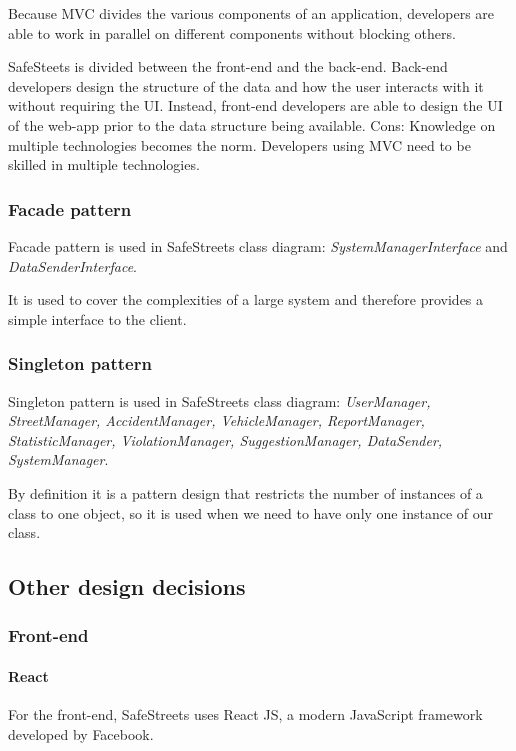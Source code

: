 Because MVC divides the various components of an application, developers are able to work in parallel on different components without blocking others. 

SafeSteets is divided between the front-end and the back-end. Back-end developers design the structure of the data and how the user interacts with it without requiring the UI. Instead, front-end developers are able to design the UI of the web-app prior to the data structure being available.
Cons: Knowledge on multiple technologies becomes the norm. Developers using MVC need to be skilled in multiple technologies.


\subsubsection{Facade pattern}
Facade pattern is used in SafeStreets class diagram: \textit{SystemManagerInterface} and \textit{DataSenderInterface}.

It is used to cover the complexities of a large system and therefore provides a simple interface to the client. 


\subsubsection{Singleton pattern}
Singleton pattern is used in SafeStreets class diagram: \textit{UserManager, StreetManager, AccidentManager, VehicleManager, ReportManager, StatisticManager, ViolationManager, SuggestionManager, DataSender, SystemManager}.

By definition it is a pattern design that restricts the number of instances of a class to one object, so it is used when we need to have only one instance of our class.


\subsection{Other design decisions}

\subsubsection{Front-end}

\paragraph{React}

For the front-end, SafeStreets uses React JS, a modern JavaScript framework developed by Facebook.


